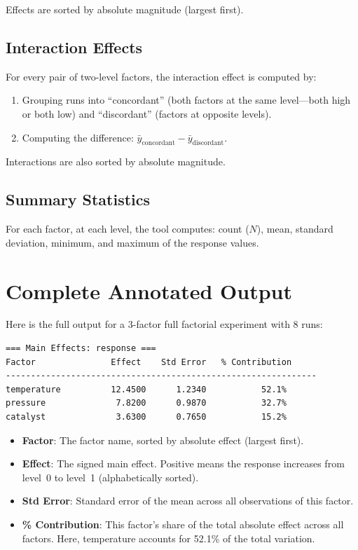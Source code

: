 \documentclass[11pt]{book}
\begin{document}
Effects are sorted by absolute magnitude (largest first).

\subsection{Interaction Effects}

For every pair of two-level factors, the interaction effect is computed by:
\begin{enumerate}
  \item Grouping runs into ``concordant'' (both factors at the same level---both high or both low) and ``discordant'' (factors at opposite levels).
  \item Computing the difference: $\bar{y}_{\text{concordant}} - \bar{y}_{\text{discordant}}$.
\end{enumerate}

Interactions are also sorted by absolute magnitude.

\subsection{Summary Statistics}

For each factor, at each level, the tool computes: count ($N$), mean, standard deviation, minimum, and maximum of the response values.

\section{Complete Annotated Output}

Here is the full output for a 3-factor full factorial experiment with 8 runs:

\begin{lstlisting}[language=bash]
=== Main Effects: response ===
Factor               Effect    Std Error   % Contribution
--------------------------------------------------------------
temperature          12.4500      1.2340           52.1%
pressure              7.8200      0.9870           32.7%
catalyst              3.6300      0.7650           15.2%
\end{lstlisting}

\begin{itemize}
  \item \textbf{Factor}: The factor name, sorted by absolute effect (largest first).
  \item \textbf{Effect}: The signed main effect. Positive means the response increases from level~0 to level~1 (alphabetically sorted).
  \item \textbf{Std Error}: Standard error of the mean across all observations of this factor.
  \item \textbf{\% Contribution}: This factor's share of the total absolute effect across all factors. Here, temperature accounts for 52.1\% of the total variation.
\end{itemize}
\end{document}

